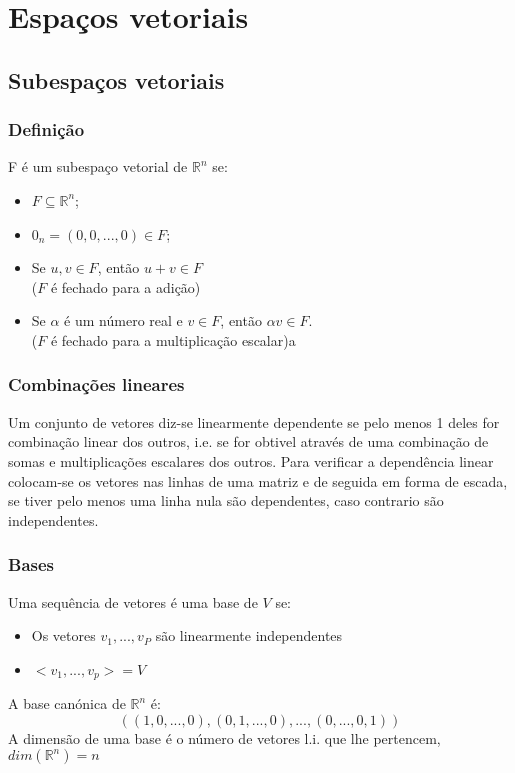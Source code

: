 \documentclass[10pt,a4paper]{report}
\begin{document}
\chapter{Espaços vetoriais}

\section{Subespaços vetoriais}

\subsection{Definição}
F é um subespaço vetorial de $\mathbb{R}^n$ se:
\begin{itemize}
\item $F \subseteq \mathbb{R}^n$;
\item $0_n = (0, 0, ..., 0) \in F$;
\item Se $u, v \in F$, então $u + v \in F$\\($F$ é fechado para a adição)
\item Se $\alpha$ é um número real e $v \in F$, então $\alpha v \in F$.\\($F$ é fechado para a multiplicação escalar)a
\end{itemize}

\subsection{Combinações lineares}
Um conjunto de vetores diz-se linearmente dependente se pelo menos 1 deles for combinação linear dos outros, i.e. se for obtivel através de uma combinação de somas e multiplicações escalares dos outros. Para verificar a dependência linear colocam-se os vetores nas linhas de uma matriz e de seguida em forma de escada, se tiver pelo menos uma linha nula são dependentes, caso contrario são independentes.

\subsection{Bases}
Uma sequência de vetores é uma base de $V$ se:
\begin{itemize}
\item Os vetores $v_1, ..., v_P$ são linearmente independentes
\item $< v_1, ..., v_p > = V$
\end{itemize}
A base canónica de $\mathbb{R}^n$ é:
$$
((1, 0, ..., 0), (0, 1, ..., 0), ..., (0, ..., 0, 1))
$$
A dimensão de uma base é o número de vetores l.i. que lhe pertencem, $dim(\mathbb{R}^n) = n$
\end{document}
